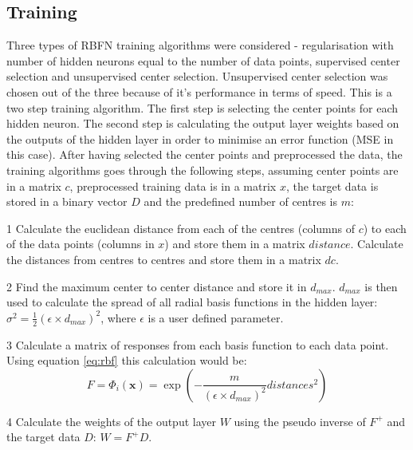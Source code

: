 \documentclass[a4paper, 11pt]{article}
\begin{document}
\subsection*{Training}
Three types of RBFN training algorithms were considered - regularisation with number of hidden neurons equal to the number of data points, supervised center selection and unsupervised center selection. Unsupervised center selection was chosen out of the three because of it's performance in terms of speed. This is a two step training algorithm. The first step is selecting the center points for each hidden neuron. The second step is  calculating the output layer weights based on the outputs of the hidden layer in order to minimise an error function (MSE in this case). After having selected the center points and preprocessed the data, the training algorithms goes through the following steps, assuming center points are in a matrix $c$, preprocessed training data is in a matrix $x$, the target data is stored in a binary vector $D$ and the predefined number of centres is $m$:
\begin{list}{•}{•}


\item[1] Calculate the euclidean distance from each of the centres (columns of $c$) to each of the data points (columns in $x$) and store them in a matrix $distance$. Calculate the distances from centres to centres and store them in a matrix $dc$.  
\item[2] Find the maximum center to center distance and store it in $d_{max}$. $d_{max}$ is then used to calculate the spread of all radial basis functions in the hidden layer: $\sigma^2 = \frac{1}{2}(\epsilon \times d_{max})^2$, where $\epsilon$ is a user defined parameter. 
\item[3] Calculate a matrix of responses from each basis function to each data point. Using equation \ref{eq:rbf} this calculation would be:
\begin{equation}
F = \Phi_i(\boldsymbol{x}) = \exp\left(-\frac{m}{(\epsilon \times d_{max})^2} distances^2 \right)  
\end{equation}
\item[4] Calculate the weights of the output layer $W$ using the pseudo inverse of $F^+$ and the target data $D$: $W= F^+D$.
\end{list}
\end{document}

